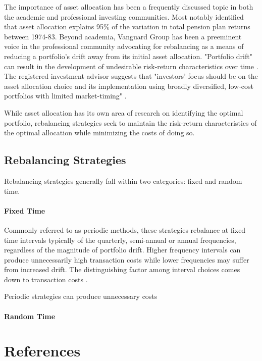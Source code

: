\documentclass[conference]{IEEEtran}
\begin{document}
The importance of asset allocation has been a frequently discussed topic in both the academic and professional investing communities. Most notably \cite{b3} identified that asset allocation explains 95\% of the variation in total pension plan returns between 1974-83. Beyond academia, Vanguard Group has been a preeminent voice in the professional community advocating for rebalancing as a means of reducing a portfolio's drift away from its initial asset allocation. "Portfolio drift" can result in the development of undesirable risk-return characteristics over time \cite{b1}. The registered investment advisor suggests that "investors’ focus should be on the asset allocation choice and its implementation using broadly diversified, low-cost portfolios with limited market-timing" \cite{b4}.

While asset allocation has its own area of research on identifying the optimal portfolio, rebalancing strategies seek to maintain the risk-return characteristics of the optimal allocation while minimizing the costs of doing so.

\subsection{Rebalancing Strategies}

Rebalancing strategies generally fall within two categories: fixed and random time.

\paragraph{Fixed Time} Commonly referred to as periodic methods, these strategies rebalance at fixed time intervals typically of the quarterly, semi-annual or annual frequencies, regardless of the magnitude of portfolio drift. Higher frequency intervals can produce unnecessarily high transaction costs while lower frequencies may suffer from increased drift. The distinguishing factor among interval choices comes down to transaction costs \cite{b1}. 

Periodic strategies can produce unnecessary costs

\paragraph{Random Time} 

\section*{References}
\end{document}
